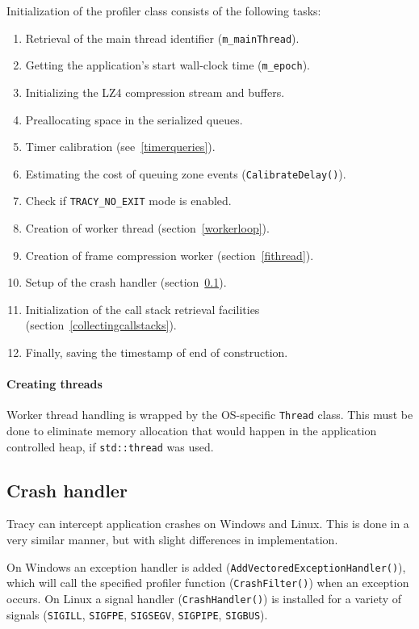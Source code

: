 \documentclass[hidelinks,titlepage,a4paper]{article}
\begin{document}
Initialization of the profiler class consists of the following tasks:

\begin{enumerate}
\item Retrieval of the main thread identifier (\texttt{m\_mainThread}).
\item Getting the application's start wall-clock time (\texttt{m\_epoch}).
\item Initializing the LZ4 compression stream and buffers.
\item Preallocating space in the serialized queues.
\item Timer calibration (see~\ref{timerqueries}).
\item Estimating the cost of queuing zone events (\texttt{CalibrateDelay()}).
\item Check if \texttt{TRACY\_NO\_EXIT} mode is enabled.
\item Creation of worker thread (section~\ref{workerloop}).
\item Creation of frame compression worker (section~\ref{fithread}).
\item Setup of the crash handler (section~\ref{crashhandler}).
\item Initialization of the call stack retrieval facilities (section~\ref{collectingcallstacks}).
\item Finally, saving the timestamp of end of construction.
\end{enumerate}

\paragraph{Creating threads}

Worker thread handling is wrapped by the OS-specific \texttt{Thread} class. This must be done to eliminate memory allocation that would happen in the application controlled heap, if \texttt{std::thread} was used.

\subsection{Crash handler}
\label{crashhandler}

Tracy can intercept application crashes on Windows and Linux. This is done in a very similar manner, but with slight differences in implementation.

On Windows an exception handler is added (\texttt{AddVectoredExceptionHandler()}), which will call the specified profiler function (\texttt{CrashFilter()}) when an exception occurs. On Linux a signal handler (\texttt{CrashHandler()}) is installed for a variety of signals (\texttt{SIGILL}, \texttt{SIGFPE}, \texttt{SIGSEGV}, \texttt{SIGPIPE}, \texttt{SIGBUS}).
\end{document}
